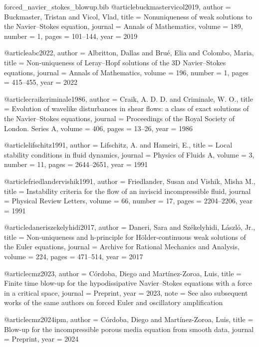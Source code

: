 \begin{filecontents*}{forced_navier_stokes_blowup.bib}
@article{buckmastervicol2019,
  author  = {Buckmaster, Tristan and Vicol, Vlad},
  title   = {Nonuniqueness of weak solutions to the {N}avier--{S}tokes equation},
  journal = {Annals of Mathematics},
  volume  = {189},
  number  = {1},
  pages   = {101--144},
  year    = {2019}
}

@article{abc2022,
  author  = {Albritton, Dallas and Bru{\'e}, Elia and Colombo, Maria},
  title   = {Non-uniqueness of {L}eray--{H}opf solutions of the {3D} {N}avier--{S}tokes equations},
  journal = {Annals of Mathematics},
  volume  = {196},
  number  = {1},
  pages   = {415--455},
  year    = {2022}
}

@article{craikcriminale1986,
  author  = {Craik, A. D. D. and Criminale, W. O.},
  title   = {Evolution of wavelike disturbances in shear flows: a class of exact solutions of the {N}avier--{S}tokes equations},
  journal = {Proceedings of the Royal Society of London. Series A},
  volume  = {406},
  pages   = {13--26},
  year    = {1986}
}

@article{lifschitz1991,
  author  = {Lifschitz, A. and Hameiri, E.},
  title   = {Local stability conditions in fluid dynamics},
  journal = {Physics of Fluids A},
  volume  = {3},
  number  = {11},
  pages   = {2644--2651},
  year    = {1991}
}

@article{friedlandervishik1991,
  author  = {Friedlander, Susan and Vishik, Misha M.},
  title   = {Instability criteria for the flow of an inviscid incompressible fluid},
  journal = {Physical Review Letters},
  volume  = {66},
  number  = {17},
  pages   = {2204--2206},
  year    = {1991}
}

@article{daneriszekelyhidi2017,
  author  = {Daneri, Sara and Sz{\'e}kelyhidi, L{\'a}szl{\'o}, Jr.},
  title   = {Non-uniqueness and h-principle for {H}\"older-continuous weak solutions of the {E}uler equations},
  journal = {Archive for Rational Mechanics and Analysis},
  volume  = {224},
  pages   = {471--514},
  year    = {2017}
}

@article{cmz2023,
  author  = {C{\'o}rdoba, Diego and Mart{\'i}nez-Zoroa, Luis},
  title   = {Finite time blow-up for the hypodissipative {N}avier--{S}tokes equations with a force in a critical space},
  journal = {Preprint},
  year    = {2023},
  note    = {See also subsequent works of the same authors on forced {E}uler and oscillatory amplification}
}

@article{cmz2024ipm,
  author  = {C{\'o}rdoba, Diego and Mart{\'i}nez-Zoroa, Luis},
  title   = {Blow-up for the incompressible porous media equation from smooth data},
  journal = {Preprint},
  year    = {2024}
}


\end{filecontents*}
